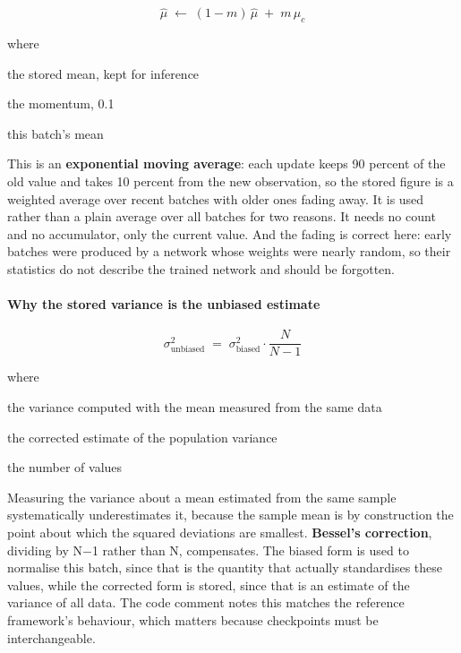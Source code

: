 \begin{equation}
\hat{\mu} \;\leftarrow\; (1-m)\,\hat{\mu} \;+\; m\,\mu_c
\end{equation}

\noindent where
\begin{description}[leftmargin=2.4em,style=nextline,font=\normalfont\ttfamily]\setlength\itemsep{1pt}
  \item[{$\hat{\mu}$}] \normalfont the stored mean, kept for inference
  \item[{$m$}] \normalfont the momentum, 0.1
  \item[{$\mu_c$}] \normalfont this batch's mean
\end{description}
This is an \textbf{exponential moving average}: each update keeps 90 percent of the old value and takes 10 percent from the new observation, so the stored figure is a weighted average over recent batches with older ones fading away. It is used rather than a plain average over all batches for two reasons. It needs no count and no accumulator, only the current value. And the fading is correct here: early batches were produced by a network whose weights were nearly random, so their statistics do not describe the trained network and should be forgotten.


\paragraph{Why the stored variance is the unbiased estimate}

\begin{equation}
\sigma^2_{\mathrm{unbiased}} \;=\; \sigma^2_{\mathrm{biased}} \cdot \frac{N}{N-1}
\end{equation}

\noindent where
\begin{description}[leftmargin=2.4em,style=nextline,font=\normalfont\ttfamily]\setlength\itemsep{1pt}
  \item[{$\sigma^2_{\mathrm{biased}}$}] \normalfont the variance computed with the mean measured from the same data
  \item[{$\sigma^2_{\mathrm{unbiased}}$}] \normalfont the corrected estimate of the population variance
  \item[{$N$}] \normalfont the number of values
\end{description}
Measuring the variance about a mean estimated from the same sample systematically underestimates it, because the sample mean is by construction the point about which the squared deviations are smallest. \textbf{Bessel's correction}, dividing by N$-$1 rather than N, compensates. The biased form is used to normalise this batch, since that is the quantity that actually standardises these values, while the corrected form is stored, since that is an estimate of the variance of all data. The code comment notes this matches the reference framework's behaviour, which matters because checkpoints must be interchangeable.


